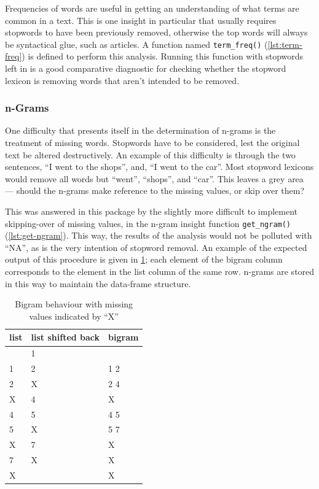 \documentclass[11pt, a4paper, titlepage]{report}
\begin{document}
Frequencies of words are useful in getting an understanding of what
terms are common in a text. This is one insight in particular that
usually requires stopwords to have been previously removed, otherwise
the top words will always be syntactical glue, such as articles. A
function named \texttt{term_freq()}
(\underline{\cref{lst:term-freq}}) is defined to perform this
analysis. Running this function with stopwords left in is a good
comparative diagnostic for checking whether the stopword lexicon is
removing words that aren't intended to be removed.

\subsubsection{n-Grams}\label{sec:n-grams}

One difficulty that presents itself in the determination of n-grams is
the treatment of missing words. Stopwords have to be considered, lest
the original text be altered destructively. An example of this
difficulty is through the two sentences, ``I went to the shops'', and,
``I went to the car''. Most stopword lexicons would remove all words
but ``went'', ``shops'', and ``car''. This leaves a grey area ---
should the n-grams make reference to the missing values, or skip over
them?

This was answered in this package by the slightly more difficult to
implement skipping-over of missing values, in the n-gram insight
function \texttt{get_ngram()}
(\underline{\cref{lst:get-ngram}}). This way, the results of the
analysis would not be polluted with ``NA'', as is the very intention
of stopword removal. An example of the expected output of this
procedure is given in \underline{\cref{tab:bigram-miss-val}}; each
element of the bigram column corresponds to the element in the list
column of the same row. n-grams are stored in this way to maintain the
data-frame structure.

\begin{table}
  \centering
  \begin{tabular}{lll}
    list & list shifted back & bigram \\
    \midrule
         & 1                 &        \\
    1    & 2                 & 1 2    \\
    2    & X                 & 2 4    \\
    X    & 4                 & X      \\
    4    & 5                 & 4 5    \\
    5    & X                 & 5 7    \\
    X    & 7                 & X      \\
    7    & X                 & X      \\
    X    &                   & X      \\
  \end{tabular}
  \caption{Bigram behaviour with missing values indicated by
    ``X''\label{tab:bigram-miss-val}}
\end{table}
\end{document}
